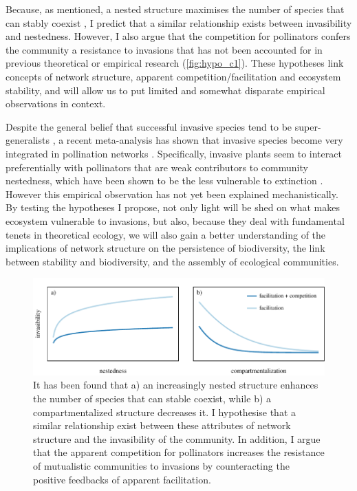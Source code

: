 \documentclass[a4paper]{article}
\begin{document}
Because, as mentioned, a nested structure maximises the number of species that can stably coexist \citep{Bastolla2009}, I predict that a similar relationship exists between invasibility and nestedness.
However, I also argue that the competition for pollinators confers the community a resistance to invasions that has not been accounted for in previous theoretical or empirical research (\autoref{fig:hypo_c1}).
These hypotheses link concepts of network structure, apparent competition/facilitation and ecosystem stability, and will allow us to put limited and somewhat disparate empirical observations in context.

Despite the general belief that successful invasive species tend to be super-generalists \citep{Richardson2000, Aizen2008, Vila2009, Albrecht2014}, a recent meta-analysis has shown that invasive species become very integrated in pollination networks \citep{Stouffer2014}.
Specifically, invasive plants seem to interact preferentially with pollinators that are weak contributors to community nestedness, which have been shown to be the less vulnerable to extinction \citep{Saavedra2011, Stouffer2014}.
However this empirical observation has not yet been explained mechanistically.
By testing the hypotheses I propose, not only light will be shed on what makes ecosystem vulnerable to invasions, but also, because they deal with fundamental tenets in theoretical ecology, we will also gain a better understanding of the implications of network structure on the persistence of biodiversity, the link between stability and biodiversity, and the assembly of ecological communities.

\begin{figure}[tbp]
  \includegraphics{hypo_c1}
  \caption{
  \label{fig:hypo_c1}
  It has been found that a) an increasingly nested structure enhances the number of species that can stable coexist, while b) a compartmentalized structure decreases it.
  I hypothesise that a similar relationship exist between these attributes of network structure and the invasibility of the community.
  In addition, I argue that the apparent competition for pollinators increases the resistance of mutualistic communities to invasions by counteracting the positive feedbacks of apparent facilitation.}
\end{figure}
\end{document}
